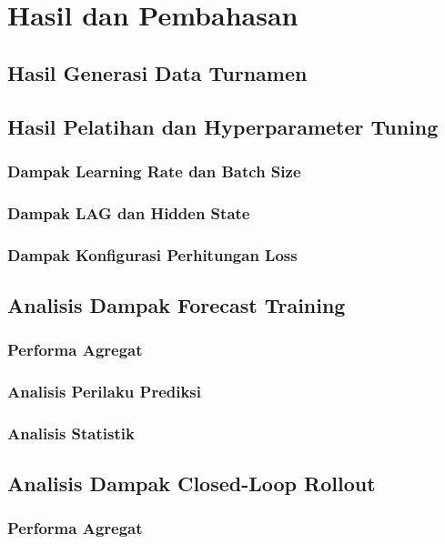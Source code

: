 \section{Hasil dan Pembahasan}

\subsection{Hasil Generasi Data Turnamen}

\subsection{Hasil Pelatihan dan Hyperparameter Tuning}
\subsubsection{Dampak Learning Rate dan Batch Size}
\subsubsection{Dampak LAG dan Hidden State}
\subsubsection{Dampak Konfigurasi Perhitungan Loss}

\subsection{Analisis Dampak Forecast Training}
\subsubsection{Performa Agregat}
\subsubsection{Analisis Perilaku Prediksi}
\subsubsection{Analisis Statistik}

\subsection{Analisis Dampak Closed-Loop Rollout}
\subsubsection{Performa Agregat}
